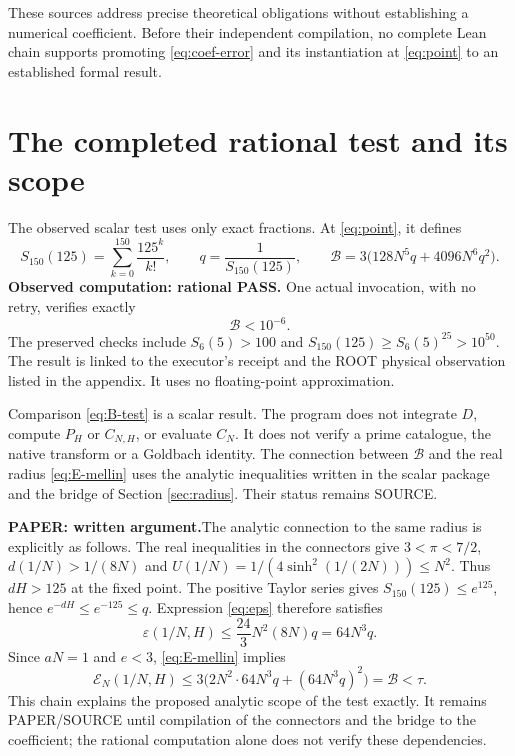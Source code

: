 \documentclass[11pt,a4paper]{article}
\theoremstyle{remark}
\newcommand{\paper}{\textbf{PAPER: written argument.}\space}
\begin{document}
These sources address precise theoretical obligations without establishing
a numerical coefficient. Before their independent compilation, no complete
Lean chain supports promoting \eqref{eq:coef-error} and its instantiation
at \eqref{eq:point} to an established formal result.

\clearpage
\section{The completed rational test and its scope}\label{sec:scalar-test}
The observed scalar test uses only exact fractions. At \eqref{eq:point},
it defines
\[
S_{150}(125)=\sum_{k=0}^{150}\frac{125^k}{k!},\qquad
q=\frac1{S_{150}(125)},\qquad
\mathcal B=3\bigl(128N^5q+4096N^6q^2\bigr).
\]
\textbf{Observed computation: rational PASS.} One actual invocation,
with no retry, verifies exactly
\begin{equation}\label{eq:B-test}
\mathcal B<10^{-6}.
\end{equation}
The preserved checks include
$S_6(5)>100$ and
$S_{150}(125)\ge S_6(5)^{25}>10^{50}$.
The result is linked to the executor's receipt and the ROOT physical
observation listed in the appendix. It uses no floating-point approximation.

Comparison \eqref{eq:B-test} is a scalar result. The program does not integrate
$D$, compute $P_H$ or $C_{N,H}$, or evaluate $C_N$. It does not verify a prime
catalogue, the native transform or a Goldbach identity. The connection between
$\mathcal B$ and the real radius \eqref{eq:E-mellin} uses the analytic
inequalities written in the scalar package and the bridge of Section
\ref{sec:radius}. Their status remains SOURCE.

\paper The analytic connection to the same radius is explicitly as follows.
The real inequalities in the connectors give $3<\pi<7/2$,
$d(1/N)>1/(8N)$ and
$U(1/N)=1/(4\sinh^2(1/(2N)))\le N^2$.
Thus $dH>125$ at the fixed point. The positive Taylor series gives
$S_{150}(125)\le e^{125}$, hence $e^{-dH}\le e^{-125}\le q$.
Expression \eqref{eq:eps} therefore satisfies
\[
\varepsilon(1/N,H)\le
\frac{24}{3}N^2(8N)q=64N^3q.
\]
Since $aN=1$ and $e<3$, \eqref{eq:E-mellin} implies
\[
\mathcal E_N(1/N,H)\le
3\bigl(2N^2\cdot64N^3q+(64N^3q)^2\bigr)=\mathcal B<\tau.
\]
This chain explains the proposed analytic scope of the test exactly.
It remains PAPER/SOURCE until compilation of the connectors and the bridge
to the coefficient; the rational computation alone does not verify
these dependencies.
\end{document}

